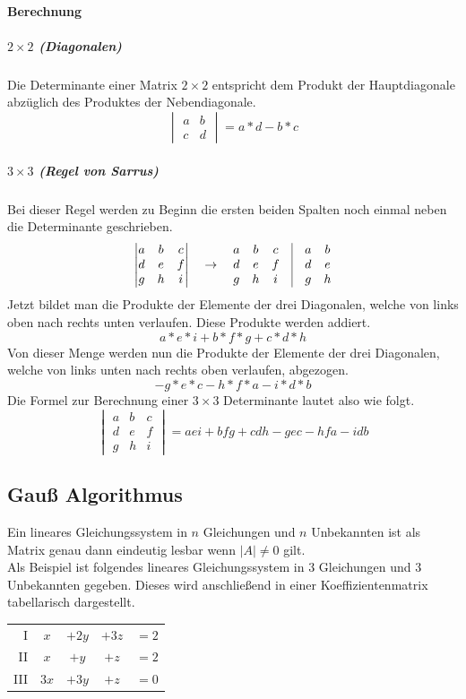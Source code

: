 \documentclass{school}
\begin{document}
\paragraph{Berechnung}
\subparagraph{$2 \times 2$ (Diagonalen)}
Die Determinante einer Matrix $2 \times 2$ entspricht dem Produkt der Hauptdiagonale abzüglich des Produktes der Nebendiagonale.
$$\begin{vmatrix}a & b\\c & d\end{vmatrix} = a * d - b * c$$
\subparagraph{$3 \times 3$ (Regel von Sarrus)}
Bei dieser Regel werden zu Beginn die ersten beiden Spalten noch einmal neben die Determinante geschrieben.
$$
\begin{vmatrix}
a & b & c\\
d & e & f\\
g & h & i
\end{vmatrix} \quad \to \quad
\begin{matrix}
a & b & c\\
d & e & f\\
g & h & i
\end{matrix}
\quad \vrule \quad
\begin{matrix}
a & b\\
d & e\\
g & h
\end{matrix}
$$
Jetzt bildet man die Produkte der Elemente der drei Diagonalen, welche von links oben nach rechts unten verlaufen.
Diese Produkte werden addiert.
$$a * e * i + b * f * g + c * d * h$$
Von dieser Menge werden nun die Produkte der Elemente der drei Diagonalen, welche von links unten nach rechts oben verlaufen, abgezogen.
$$- g * e * c - h * f * a - i * d * b$$
Die Formel zur Berechnung einer $3 \times 3$ Determinante lautet also wie folgt.
$$
\begin{vmatrix}
a & b & c\\
d & e & f\\
g & h & i
\end{vmatrix} = aei + bfg + cdh - gec - hfa - idb
$$

\newpage
\subsection{Gauß Algorithmus}
Ein lineares Gleichungssystem in $n$ Gleichungen und $n$ Unbekannten ist als Matrix genau dann eindeutig lesbar wenn $|A| \ne 0$ gilt.
\vspace{1 em}\\
Als Beispiel ist folgendes lineares Gleichungssystem in $3$ Gleichungen und $3$ Unbekannten gegeben. Dieses wird anschließend in einer Koeffizientenmatrix tabellarisch dargestellt.
\begin{center}
    \begin{tabular}{r c c c c}
        I & $x$ & $ +2y$ & $+3z$ & $= 2 $\\
        II & $x$ & $+y$ & $+z$ & $= 2$\\
        III & $3x$ & $+3y$ & $+z$ & $= 0$
    \end{tabular}
\end{center}
\end{document}
